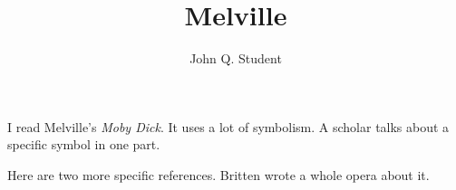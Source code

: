 \documentclass{article}
\title{Melville}
\author{John Q. Student}
\begin{document}
\maketitle

I read Melville's \emph{Moby Dick}.\Autocite{Melville:MobyDick}
It uses a lot of symbolism.\Autocite{Smith:Symbolism}
A scholar talks about a specific symbol in one part.%
\Autocite[143--144]{Smith:Symbolism}

Here are two more specific references.%
\Autocites
[150]{Smith:Symbolism}
[74]{Gunderson:MelvilleWomen}
Britten wrote a whole opera about it.%
\Autocite[s. v. \emph{Britten, Benjamin}]{GroveMusic}

\printbibliography[title={Bibliography}]
\end{document}

